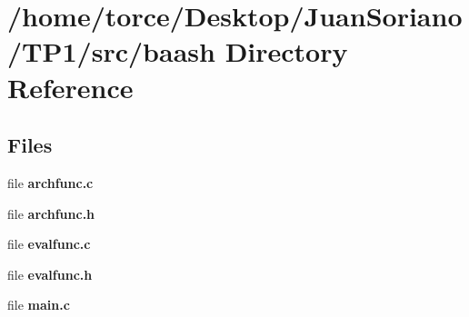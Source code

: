 \section{/home/torce/\+Desktop/\+Juan\+Soriano/\+T\+P1/src/baash Directory Reference}
\label{dir_754e4702affdfe2f0a6472b421fc3dab}
\subsection*{Files}
\begin{DoxyCompactItemize}
\item 
file {\bf archfunc.\+c}
\item 
file {\bf archfunc.\+h}
\item 
file {\bf evalfunc.\+c}
\item 
file {\bf evalfunc.\+h}
\item 
file {\bf main.\+c}
\end{DoxyCompactItemize}
